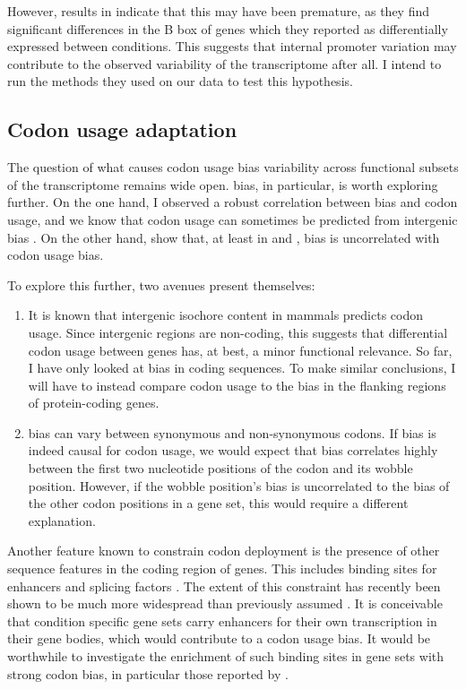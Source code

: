 However, results in \citet{Gingold:2014} indicate that this may have been
premature, as they find significant differences in the B box of \trna genes
which they reported as differentially expressed between conditions. This
suggests that internal promoter variation may contribute to the observed
variability of the \trna transcriptome after all. I intend to run the methods
they used on our data to test this hypothesis.

\subsection{Codon usage adaptation}

The question of what causes codon usage bias variability across functional
subsets of the transcriptome remains wide open. \gc bias, in particular, is
worth exploring further. On the one hand, I observed a robust correlation
between \gc bias and codon usage, and we know that codon usage can sometimes be
predicted from intergenic \gc bias \citep{Chen:2004}. On the other hand,
\citet{Duret:2002} show that, at least in  and , \gc
bias is uncorrelated with codon usage bias.

To explore this further, two avenues present themselves:

\begin{enumerate}
    \item It is known that intergenic isochore \gc content in mammals predicts
        codon usage. Since intergenic regions are non-coding, this suggests that
        differential codon usage between genes has, at best, a minor functional
        relevance. So far, I have only looked at \gc bias in coding sequences.
        To make similar conclusions, I will have to instead compare codon usage
        to the \gc bias in the flanking regions of protein-coding genes.
    \item \gc bias can vary between synonymous and non-synonymous codons. If \gc
        bias is indeed causal for codon usage, we would expect that \gc bias
        correlates highly between the first two nucleotide positions of the
        codon and its wobble position. However, if the wobble position’s \gc
        bias is uncorrelated to the \gc bias of the other codon positions in a
        gene set, this would require a different explanation.
\end{enumerate}

Another feature known to constrain codon deployment is the presence of other
sequence features in the coding region of genes. This includes binding sites for
enhancers and splicing factors \citep{Hyder:1995,Blencowe:2000}. The extent of
this constraint has recently been shown to be much more widespread than
previously assumed \citep{Stergachis:2013}. It is conceivable that condition
specific gene sets carry enhancers for their own transcription in their gene
bodies, which would contribute to a codon usage bias. It would be worthwhile to
investigate the enrichment of such binding sites in gene sets with strong codon
bias, in particular those reported by \citep{Gingold:2014}.

